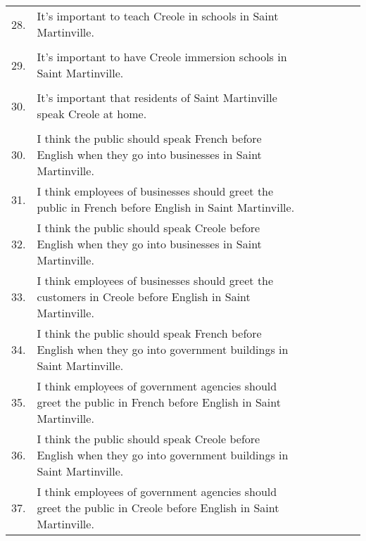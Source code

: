 \begin{longtable}[c]{| r p{} | c | c | c | c | c |}
          &                                                                           & & & & & \\
      \hline
      28. & It's important to teach Creole in schools in Saint Martinville.           & & & & & \\
          &                                                                           & & & & & \\
      \hline
      29. & It's important to have Creole immersion schools in Saint Martinville.     & & & & & \\
          &                                                                           & & & & & \\
      \hline
      30. & It's important that residents of Saint Martinville speak Creole at home.  & & & & & \\
          &                                                                           & & & & & \\
      \hline
      30. & I think the public should speak French before English when they go into businesses in Saint Martinville. & & & & & \\
      \hline
      31. & I think employees of businesses should greet the public in French before English in Saint Martinville. & & & & & \\
      \hline
      32. & I think the public should speak Creole before English when they go into businesses in Saint Martinville. & & & & & \\
      \hline
      33. & I think employees of businesses should greet the customers in Creole before English in Saint Martinville. & & & & & \\
      \hline
      34. & I think the public should speak French before English when they go into government buildings in Saint Martinville. & & & & & \\
      \hline
      35. & I think employees of government agencies should greet the public in French before English in Saint Martinville. & & & & & \\
      \hline
      36. & I think the public should speak Creole before English when they go into government buildings in Saint Martinville. & & & & & \\
      \hline
      37. & I think employees of government agencies should greet the public in Creole before English in Saint Martinville. & & & & & \\
      \hline
    \end{longtable}

